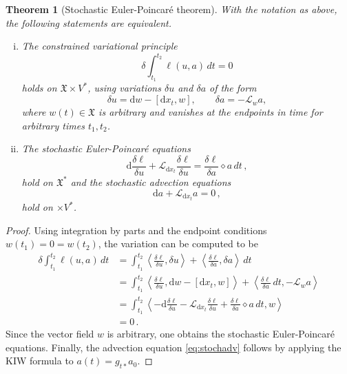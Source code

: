 \documentclass[11pt, oneside]{article}   	%
\numberwithin{equation}{section}
\theoremstyle{plain}
\newtheorem{theorem}{Theorem}[section]
\theoremstyle{definition}
\theoremstyle{remark}
\newcommand{\<}{\langle}
\renewcommand{\>}{\rangle}
\def\rmd{{\mathrm{d}}}
\begin{document}
\begin{theorem}[Stochastic Euler-Poincar\'e theorem]\label{thm:SEP}
With the notation as above, the following statements are equivalent.
\begin{enumerate}[i)]
\item The constrained variational principle
\begin{equation}
\delta\int_{t_1}^{t_2}\ell(u,a)\,dt = 0
\end{equation}
holds on $\mathfrak{X}\times V^*$, using variations $\delta u$ and $\delta a$ of the form
\begin{equation}
\delta u = {\rmd}w - [{\rmd}x_t,w], \qquad \delta a = -\mathcal{L}_w a,
\label{EPstoch-var}
\end{equation}
where $w(t)\in \mathfrak{X}$ is arbitrary and vanishes at the endpoints in time for arbitrary times $t_1,t_2$.
\item The stochastic Euler-Poincar\'e equations
\begin{equation}
{\rmd}\frac{\delta \ell}{\delta u} + \mathcal{L}_{{\rmd}x_t}\frac{\delta \ell}{\delta u} 
= \frac{\delta \ell}{\delta a}\diamond a\,dt\,,
\label{eq:stochep}
\end{equation}
hold on $\mathfrak{X}^*$ and the stochastic advection equations
\begin{equation}
{\rmd}a + \mathcal{L}_{{\rmd}x_t}a = 0\,,
\label{eq:stochadv}
\end{equation}
hold on $\times V^*$.
\end{enumerate}
\end{theorem} 

\begin{proof}
Using integration by parts and the endpoint conditions $w(t_1)=0=w(t_2)$, the variation can be computed to be
\begin{equation}
\begin{aligned}
\delta\int_{t_1}^{t_2}\ell(u,a)\,dt 
&= 
\int_{t_1}^{t_2}\left\langle\frac{\delta\ell}{\delta u},\delta u\right\rangle + \left\langle\frac{\delta\ell}{\delta a},\delta a\right\rangle\,dt\\
&= \int_{t_1}^{t_2}\left\langle\frac{\delta\ell}{\delta u},{\rmd}w-[{\rmd}x_t,w]\right\rangle + \left\langle\frac{\delta\ell}{\delta a}\,dt,-\mathcal{L}_w a\right\rangle\\
&= \int_{t_1}^{t_2}\left\langle -{\rmd}\frac{\delta\ell}{\delta u} - \mathcal{L}_{{\rmd}x_t}\frac{\delta\ell}{\delta u} + \frac{\delta\ell}{\delta a}\diamond a\,dt,w\right\rangle\\
&= 0\,.
\end{aligned}
\label{eq:StochEPeqns}
\end{equation}
Since the vector field $w$ is arbitrary, one obtains the stochastic Euler-Poincar\'e equations. Finally, the advection equation \eqref{eq:stochadv} follows by applying the KIW formula to $a(t)=g_{t*}a_0$.
\end{proof}
\end{document}
